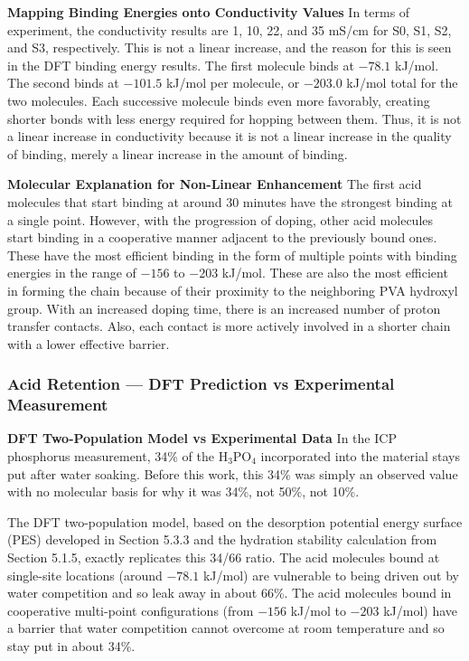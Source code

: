 \documentclass[12pt,a4paper]{report}
\begin{document}
\textbf{Mapping Binding Energies onto Conductivity Values}
In terms of experiment, the conductivity results are 1, 10, 22, and 35 mS/cm for S0, S1, S2, and S3, respectively. This is not a linear increase, and the reason for this is seen in the DFT binding energy results. The first molecule binds at \(-78.1\) kJ/mol. The second binds at \(-101.5\) kJ/mol per molecule, or \(-203.0\) kJ/mol total for the two molecules. Each successive molecule binds even more favorably, creating shorter bonds with less energy required for hopping between them. Thus, it is not a linear increase in conductivity because it is not a linear increase in the quality of binding, merely a linear increase in the amount of binding. \cite{21, 55, 100}

\textbf{Molecular Explanation for Non-Linear Enhancement}
The first acid molecules that start binding at around 30 minutes have the strongest binding at a single point. However, with the progression of doping, other acid molecules start binding in a cooperative manner adjacent to the previously bound ones. These have the most efficient binding in the form of multiple points with binding energies in the range of \(-156\) to \(-203\) kJ/mol. These are also the most efficient in forming the chain because of their proximity to the neighboring PVA hydroxyl group. With an increased doping time, there is an increased number of proton transfer contacts. Also, each contact is more actively involved in a shorter chain with a lower effective barrier.\cite{21, 55, 100}

\subsubsection{Acid Retention — DFT Prediction vs Experimental Measurement}

\textbf{DFT Two-Population Model vs Experimental Data}
In the ICP phosphorus measurement, 34\% of the H\(_3\)PO\(_4\) incorporated into the material stays put after water soaking. Before this work, this 34\% was simply an observed value with no molecular basis for why it was 34\%, not 50\%, not 10\%.

The DFT two-population model, based on the desorption potential energy surface (PES) developed in Section 5.3.3 and the hydration stability calculation from Section 5.1.5, exactly replicates this 34/66 ratio. The acid molecules bound at single-site locations (around \(-78.1\) kJ/mol) are vulnerable to being driven out by water competition and so leak away in about 66\%. The acid molecules bound in cooperative multi-point configurations (from \(-156\) kJ/mol to \(-203\) kJ/mol) have a barrier that water competition cannot overcome at room temperature and so stay put in about 34\%. \cite{63, 64}
\end{document}

